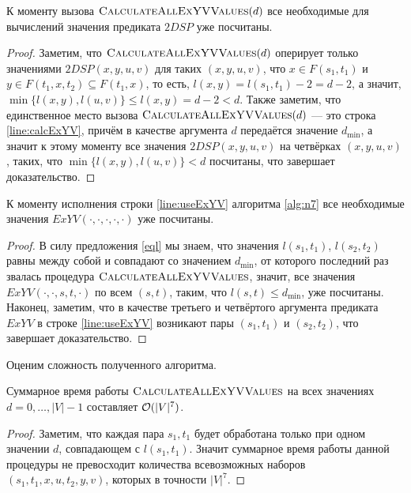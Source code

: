 \begin{proposition} \label{n7_corr1}
К моменту вызова $\textsc{CalculateAllExYVValues}(d)$ все необходимые для вычислений значения предиката $2DSP$ уже посчитаны.
\end{proposition}
\begin{proof}
Заметим, что $\textsc{CalculateAllExYVValues}(d)$ оперирует только значениями $2DSP(x, y, u, v)$ для таких $(x, y, u, v)$, что $x \in F(s_1, t_1)$ и $y \in F(t_1,x,t_2) \subseteq F(t_1,x)$, то есть, $l(x, y) = l(s_1, t_1) - 2 = d - 2$, а значит, $\min\{l(x, y), l(u, v)\} \leq l(x, y) = d - 2 < d$. Также заметим, что единственное место вызова $\textsc{CalculateAllExYVValues}(d)$ --- это строка \ref{line:calcExYV}, причём в качестве аргумента $d$ передаётся значение $d_{\min}$, а значит к этому моменту все значения $2DSP(x, y, u, v)$ на четвёрках $(x, y, u, v)$, таких, что $\min\{l(x, y), l(u, v)\} < d$ посчитаны, что завершает доказательство. 
\end{proof}

\begin{proposition} \label{n7_corr2}
К моменту исполнения строки \ref{line:useExYV} алгоритма \ref{alg:n7} все необходимые значения $ExYV(\cdot, \cdot, \cdot, \cdot, \cdot)$ уже посчитаны.
\end{proposition}
\begin{proof}
В силу предложения \ref{eql} мы знаем, что значения $l(s_1, t_1)$, $l(s_2, t_2)$ равны между собой и совпадают со значением $d_{\min}$, от которого последний раз звалась процедура $\textsc{CalculateAllExYVValues}$, значит, все значения $ExYV(\cdot, \cdot, s, t, \cdot)$ по всем $(s, t)$, таким, что $l(s, t) \leq d_{\min}$, уже посчитаны. Наконец, заметим, что в качестве третьего и четвёртого аргумента предиката $ExYV$ в строке \ref{line:useExYV} возникают пары $(s_1, t_1)$ и $(s_2, t_2)$, что завершает доказательство.
\end{proof}

Оценим сложность полученного алгоритма.

\begin{proposition} \label{n7_rt1}
Суммарное время работы $\textsc{CalculateAllExYVValues}$ на всех значениях $d = 0, \ldots, |V|-1$ составляет $\mathcal{O}(|V|^7)$. 
\end{proposition}
\begin{proof}
Заметим, что каждая пара $s_1, t_1$ будет обработана только при одном значении $d$, совпадающем с $l(s_1, t_1)$. Значит суммарное время работы данной процедуры не превосходит количества всевозможных наборов $(s_1, t_1, x, u, t_2, y, v)$, которых в точности $|V|^7$.
\end{proof}

